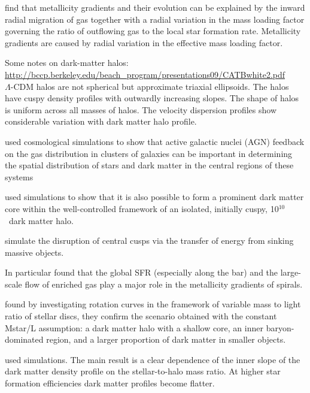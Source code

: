 \documentclass[11pt, a4paper, onecolumn]{article}
\begin{document}
\begin{multicols}{2}
    \citet{jones12}  find that metallicity gradients and their evolution can be
    explained by the inward radial migration of gas together with a radial
    variation in the mass loading factor governing the ratio of outflowing gas
    to the local star formation rate. Metallicity gradients are caused by
    radial variation in the effective mass loading factor.


    Some notes on dark-matter halos:\\
    \url{http://bccp.berkeley.edu/beach_program/presentations09/CATBwhite2.pdf}\\
    $\Lambda$-CDM halos are not spherical but approximate triaxial ellipsoids.
    The halos have cuspy density profiles with outwardly increasing slopes.
    The shape of halos is uniform across all masses of halos.  The velocity
    dispersion profiles show considerable variation with dark matter halo
    profile.

    \citet{martizzi13} used cosmological simulations to show that active
    galactic nuclei (AGN) feedback on the gas distribution in clusters of
    galaxies can be important in determining the spatial distribution of stars
    and dark matter in the central regions of these systems

    \citet{teyssier13} used simulations to show that it is also possible to
    form a prominent dark matter core within the well-controlled framework of
    an isolated, initially cuspy, 10$^{10}$ \msun\ dark matter halo.

    \citet{goerdt10} simulate the disruption of central cusps via the transfer
    of energy from sinking massive objects.



    In particular 
    \citet{martel13} found that the global SFR (especially along the bar) and
    the large-scale flow of enriched gas play a major role in the metallicity
    gradients of spirals.

    \citet{portinari10} found by investigating rotation curves in the framework
    of variable mass to light ratio of stellar discs, they confirm the scenario
    obtained with the constant Mstar/L assumption: a dark matter halo with a
    shallow core, an inner baryon-dominated region, and a larger proportion of
    dark matter in smaller objects.


    \citet{dicintio14} used simulations. The main result is a clear dependence
    of the inner slope of the dark matter density profile on the
    stellar-to-halo mass ratio. At higher star formation efficiencies dark
    matter profiles become flatter. 


\end{multicols}
\end{document}
